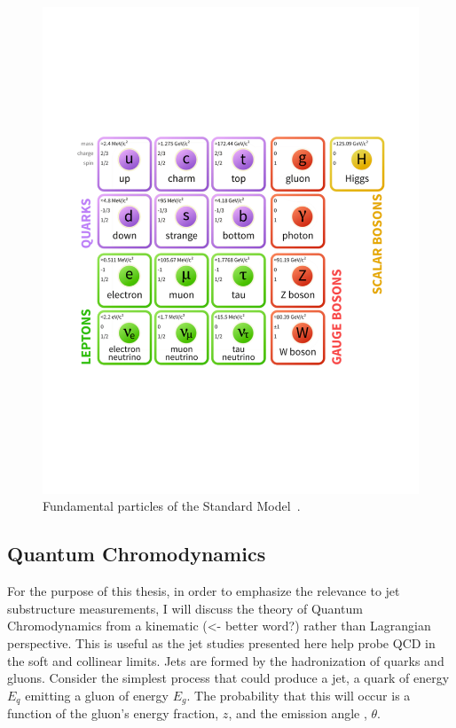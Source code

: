 \begin{figure}[htb]
\centering
\includegraphics[width=1.0\textwidth]{smdiagram.pdf}
\caption{Fundamental particles of the Standard Model~\cite{modellinginvisible}.}
\label{fig:SM}
\end{figure}






\subsection{Quantum Chromodynamics}\label{secSM:ch1}


For the purpose of this thesis, in order to emphasize the relevance to jet substructure measurements, I will discuss the theory of Quantum Chromodynamics from a kinematic (<- better word?) rather than Lagrangian perspective. This is useful as the jet studies presented here help probe QCD in the soft and collinear limits. 
Jets are formed by the hadronization of quarks and gluons. Consider the simplest process that could produce a jet, a quark of energy $E_q$  emitting a gluon of energy $E_g$. The probability that this will occur is a function of the gluon's energy fraction, $z$, and the emission angle , $\theta$.\newline



